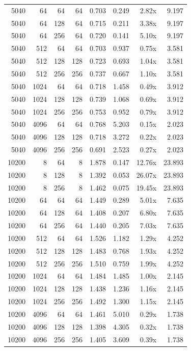 {\begin{longtable}{rrrrrrrr}
5040 & 64 & 64 & 64 & 0.703 & 0.249 & 2.82x & 9.197\\
5040 & 64 & 128 & 64 & 0.715 & 0.211 & 3.38x & 9.197\\
5040 & 64 & 256 & 64 & 0.720 & 0.141 & 5.10x & 9.197\\
5040 & 512 & 64 & 64 & 0.703 & 0.937 & 0.75x & 3.581\\
5040 & 512 & 128 & 128 & 0.723 & 0.693 & 1.04x & 3.581\\
5040 & 512 & 256 & 256 & 0.737 & 0.667 & 1.10x & 3.581\\
5040 & 1024 & 64 & 64 & 0.718 & 1.458 & 0.49x & 3.912\\
5040 & 1024 & 128 & 128 & 0.739 & 1.068 & 0.69x & 3.912\\
5040 & 1024 & 256 & 256 & 0.753 & 0.952 & 0.79x & 3.912\\
5040 & 4096 & 64 & 64 & 0.768 & 5.203 & 0.15x & 2.023\\
5040 & 4096 & 128 & 128 & 0.718 & 3.272 & 0.22x & 2.023\\
5040 & 4096 & 256 & 256 & 0.691 & 2.523 & 0.27x & 2.023\\
10200 & 8 & 64 & 8 & 1.878 & 0.147 & 12.76x & 23.893\\
10200 & 8 & 128 & 8 & 1.392 & 0.053 & 26.07x & 23.893\\
10200 & 8 & 256 & 8 & 1.462 & 0.075 & 19.45x & 23.893\\
10200 & 64 & 64 & 64 & 1.449 & 0.289 & 5.01x & 7.635\\
10200 & 64 & 128 & 64 & 1.408 & 0.207 & 6.80x & 7.635\\
10200 & 64 & 256 & 64 & 1.440 & 0.205 & 7.03x & 7.635\\
10200 & 512 & 64 & 64 & 1.526 & 1.182 & 1.29x & 4.252\\
10200 & 512 & 128 & 128 & 1.483 & 0.768 & 1.93x & 4.252\\
10200 & 512 & 256 & 256 & 1.510 & 0.759 & 1.99x & 4.252\\
10200 & 1024 & 64 & 64 & 1.484 & 1.485 & 1.00x & 2.145\\
10200 & 1024 & 128 & 128 & 1.438 & 1.236 & 1.16x & 2.145\\
10200 & 1024 & 256 & 256 & 1.492 & 1.300 & 1.15x & 2.145\\
10200 & 4096 & 64 & 64 & 1.461 & 5.010 & 0.29x & 1.738\\
10200 & 4096 & 128 & 128 & 1.398 & 4.305 & 0.32x & 1.738\\
10200 & 4096 & 256 & 256 & 1.405 & 3.609 & 0.39x & 1.738\\

\end{longtable}}

